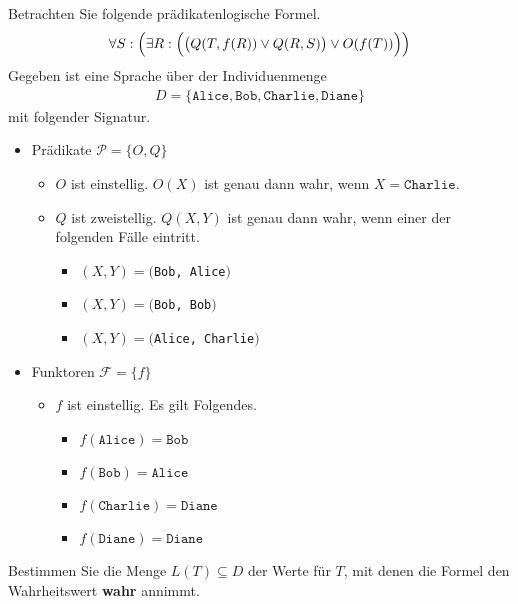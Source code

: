 \documentclass{uebungsblatt}
\begin{document}
\begin{loesung} 

\end{loesung}
\newpage
\begin{aufgabe}
\medskip
Betrachten Sie folgende prädikatenlogische Formel.
\begin{align*}
\forall S:\Bigl(\exists R:\Bigl(\bigl(Q(T,f(R))\lor Q(R,S)\bigr)\lor O(f(T))\Bigr)\Bigr)
\end{align*}
Gegeben ist eine Sprache über der Individuenmenge
\begin{align*}
D=\{\mathtt{Alice, Bob, Charlie, Diane}\}
\end{align*}
mit folgender Signatur.
\begin{itemize}
    \item Prädikate $\mathcal{P}=\{O,Q\}$
    \begin{itemize}
        \item $O$ ist einstellig. $O(X)$ ist genau dann wahr, wenn $X=\mathtt{Charlie}$.
        \item $Q$ ist zweistellig. $Q(X,Y)$ ist genau dann wahr, 
              wenn einer der folgenden Fälle eintritt.
        \begin{itemize}
            \item $(X,Y)=($\texttt{Bob, Alice}$)$
            \item $(X,Y)=($\texttt{Bob, Bob}$)$
            \item $(X,Y)=($\texttt{Alice, Charlie}$)$
        \end{itemize}
    \end{itemize}
    \item Funktoren $\mathcal{F}=\{f\}$
    \begin{itemize}
        \item $f$ ist einstellig. Es gilt Folgendes.
          \begin{itemize}
            \item $f(\mathtt{Alice})=\mathtt{Bob}$
            \item $f(\mathtt{Bob})=\mathtt{Alice}$
            \item $f(\mathtt{Charlie})=\mathtt{Diane}$
            \item $f(\mathtt{Diane})=\mathtt{Diane}$
          \end{itemize}
    \end{itemize}
\end{itemize}
Bestimmen Sie die Menge $L(T)\subseteq D$ der Werte für $T$, mit denen die Formel den
Wahrheitswert \textbf{wahr} annimmt. \\

\end{aufgabe}
\begin{loesung}

\end{loesung}
\end{document}
